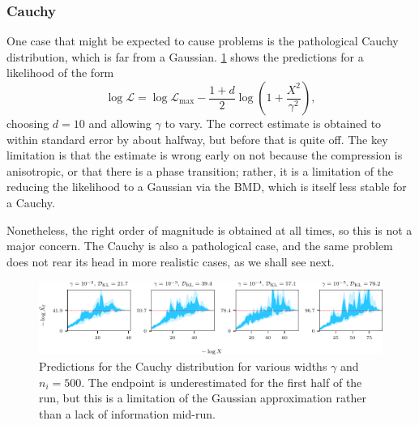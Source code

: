 \documentclass[usenatbib]{mnras}
\newcommand{\nlive}{n_i}
\begin{document}
\subsubsection{Cauchy}
One case that might be expected to cause problems is the pathological Cauchy distribution, which is far from a Gaussian. \cref{fig:cauchy_predictions} shows the predictions for a likelihood of the form
\begin{equation}
	\log\mathcal{L} = \log\mathcal{L}_\mathrm{max} - \frac{1 + d}{2} \log \left(1 + \frac{X^2}{\gamma^2}\right),
\end{equation}
choosing $d = 10$ and allowing $\gamma$ to vary. The correct estimate is obtained to within standard error by about halfway, but before that is quite off. The key limitation is that the estimate is wrong early on not because the compression is anisotropic, or that there is a phase transition; rather, it is a limitation of the reducing the likelihood to a Gaussian via the BMD, which is itself less stable for a Cauchy.
\par
Nonetheless, the right order of magnitude is obtained at all times, so this is not a major concern. The Cauchy is also a pathological case, and the same problem does not rear its head in more realistic cases, as we shall see next.
\begin{figure}
\begin{center}
    \includegraphics{figures/cauchy_predictions.pdf}
\end{center}
\caption{Predictions for the Cauchy distribution for various widths $\gamma$ and $\nlive = 500$. The endpoint is underestimated for the first half of the run, but this is a limitation of the Gaussian approximation rather than a lack of information mid-run.}

\label{fig:cauchy_predictions}
\end{figure}
\end{document}

